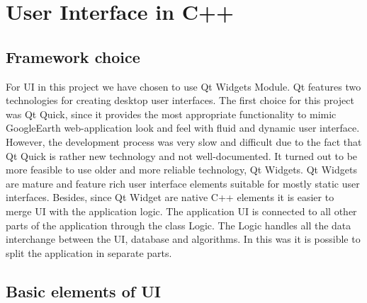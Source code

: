 \documentclass[reqno,openany,12pt]{amsbook}
\theoremstyle{definition}
\theoremstyle{remark}
\begin{document}
\section{User Interface in C++}
\subsection{Framework choice}

For UI in this project we have chosen to use Qt Widgets Module. Qt features two technologies for creating desktop user interfaces. The first choice for this project was Qt Quick, since it provides the most appropriate functionality to mimic GoogleEarth web-application look and feel with fluid and dynamic user interface. However, the development process was very slow and difficult due to the fact that Qt Quick is rather new technology and not well-documented. It turned out to be more feasible to use older and more reliable technology, Qt Widgets. Qt Widgets are mature and feature rich user interface elements suitable for mostly static user interfaces. Besides, since Qt Widget are native C++ elements it is easier to merge UI with the application logic.
The application UI is connected to all other parts of the application through the class Logic.  The Logic handles all the data interchange between the UI, database and algorithms. In this was it is possible to split the application in separate parts. 

\subsection{Basic elements of UI}
\end{document}
